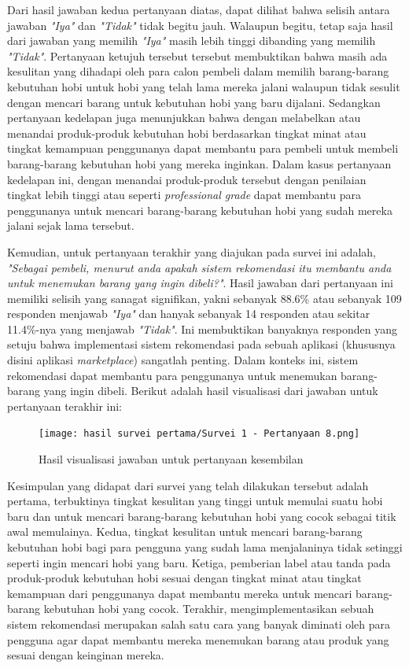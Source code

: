 \documentclass[a4paper]{article}
\begin{document}
Dari hasil jawaban kedua pertanyaan diatas, dapat dilihat bahwa selisih antara jawaban \textit{"Iya"} dan \textit{"Tidak"} tidak begitu jauh. Walaupun begitu, tetap saja hasil dari jawaban yang memilih \textit{"Iya"} masih lebih tinggi dibanding yang memilih \textit{"Tidak"}. Pertanyaan ketujuh tersebut tersebut membuktikan bahwa masih ada kesulitan yang dihadapi oleh para calon pembeli dalam memilih barang-barang kebutuhan hobi untuk hobi yang telah lama mereka jalani walaupun tidak sesulit dengan mencari barang untuk kebutuhan hobi yang baru dijalani. Sedangkan pertanyaan kedelapan juga menunjukkan bahwa dengan melabelkan atau menandai produk-produk kebutuhan hobi berdasarkan tingkat minat atau tingkat kemampuan penggunanya dapat membantu para pembeli untuk membeli barang-barang kebutuhan hobi yang mereka inginkan. Dalam kasus pertanyaan kedelapan ini, dengan menandai produk-produk tersebut dengan penilaian tingkat lebih tinggi atau seperti \textit{professional grade} dapat membantu para penggunanya untuk mencari barang-barang kebutuhan hobi yang sudah mereka jalani sejak lama tersebut.

Kemudian, untuk pertanyaan terakhir yang diajukan pada survei ini adalah, \textit{"Sebagai pembeli, menurut anda apakah sistem rekomendasi itu membantu anda untuk menemukan barang yang ingin dibeli?"}. Hasil jawaban dari pertanyaan ini memiliki selisih yang sanagat signifikan, yakni sebanyak 88.6\% atau sebanyak 109 responden menjawab \textit{"Iya"} dan hanyak sebanyak 14 responden atau sekitar 11.4\%-nya yang menjawab \textit{"Tidak"}. Ini membuktikan banyaknya responden yang setuju bahwa implementasi sistem rekomendasi pada sebuah aplikasi (khususnya disini aplikasi \textit{marketplace}) sangatlah penting. Dalam konteks ini, sistem rekomendasi dapat membantu para penggunanya untuk menemukan barang-barang yang ingin dibeli. Berikut adalah hasil visualisasi dari jawaban untuk pertanyaan terakhir ini:

\begin{figure}[h]
    \centering
    \texttt{[image: hasil survei pertama/Survei 1 - Pertanyaan 8.png]}
    \caption{Hasil visualisasi jawaban untuk pertanyaan kesembilan}
\end{figure}
\newpage
Kesimpulan yang didapat dari survei yang telah dilakukan tersebut adalah pertama, terbuktinya tingkat kesulitan yang tinggi untuk memulai suatu hobi baru dan untuk mencari barang-barang kebutuhan hobi yang cocok sebagai titik awal memulainya. Kedua, tingkat kesulitan untuk mencari barang-barang kebutuhan hobi bagi para pengguna yang sudah lama menjalaninya tidak setinggi seperti ingin mencari hobi yang baru. Ketiga, pemberian label atau tanda pada produk-produk kebutuhan hobi sesuai dengan tingkat minat atau tingkat kemampuan dari penggunanya dapat membantu mereka untuk mencari barang-barang kebutuhan hobi yang cocok. Terakhir, mengimplementasikan sebuah sistem rekomendasi merupakan salah satu cara yang banyak diminati oleh para pengguna agar dapat membantu mereka menemukan barang atau produk yang sesuai dengan keinginan mereka.
\end{document}
